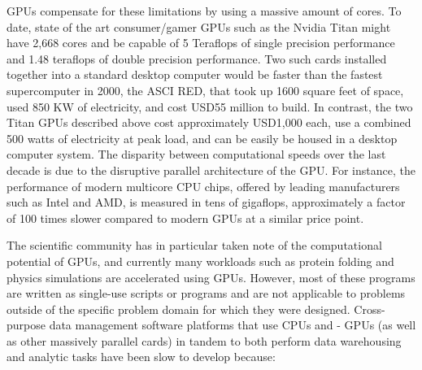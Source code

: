 \documentclass[twocolumn]{article}
\begin{document}
GPUs compensate for these limitations by using a massive amount of cores. To date, state of the art consumer/gamer GPUs such as the Nvidia Titan might have 2,668 cores and be capable of 5 Teraflops of single precision performance and 1.48 teraflops of double precision performance. Two such cards installed together into a standard desktop computer would be faster than the fastest supercomputer in 2000, the ASCI RED, that took up 1600 square feet of space, used 850 KW of electricity, and cost USD55 million to build. In contrast, the two Titan GPUs described above cost approximately USD1,000 each, use a combined 500 watts of electricity at peak load, and can be easily be housed in a desktop computer system. The disparity between computational speeds over the last decade is due to the disruptive parallel architecture of the GPU. For instance, the performance of modern multicore CPU chips, offered by leading manufacturers such as Intel and AMD, is measured in tens of gigaflops, approximately a factor of 100 times slower compared to modern GPUs at a similar price point.

The scientific community has in particular taken note of the computational potential of GPUs, and currently many workloads such as protein folding and physics simulations are
accelerated using GPUs. However, most of these programs are written as single-use scripts or programs and are not applicable to problems outside of the specific problem domain for which they were designed. Cross-purpose data management software platforms that use CPUs and - GPUs (as well as other massively parallel cards) in tandem to both perform data warehousing and analytic tasks have been slow to develop because:
\end{document}
